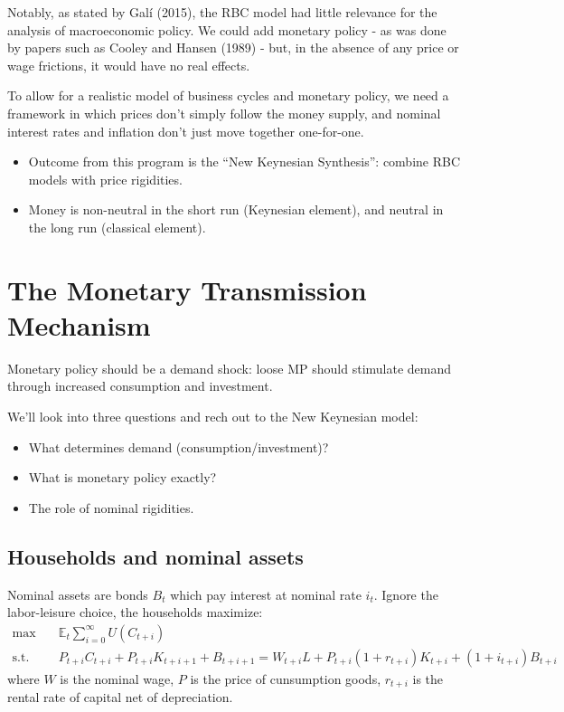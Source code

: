 Notably, as stated by Galí (2015\cite{gali2015monetary}), the RBC model had little relevance for the analysis of macroeconomic policy. We could add
monetary policy - as was done by papers such as Cooley and Hansen (1989\cite{cooley1989inflation}) - 
but, in the absence of any price or wage frictions, it would have no real effects.

To allow for a realistic model of business cycles and monetary policy, we need
a framework in which prices don't simply follow the money supply, and nominal interest rates and
inflation don't just move together one-for-one.

\begin{itemize}
    \item Outcome from this program is the “New Keynesian
    Synthesis”: combine RBC models with price rigidities.
    \item Money is non-neutral in the short run (Keynesian
    element), and neutral in the long run (classical element).
\end{itemize}

\section{The Monetary Transmission Mechanism}

Monetary policy should be a demand shock: loose MP should
stimulate demand through increased consumption and
investment.

We'll look into three questions and rech out to the New Keynesian model:
\begin{itemize}
    \item What determines demand (consumption/investment)?
    \item What is monetary policy exactly?
    \item The role of nominal rigidities.
\end{itemize}

\subsection{Households and nominal assets}

Nominal assets are bonds $B_t$ which pay interest at nominal rate $i_t$.
Ignore the labor-leisure choice, the households maximize:
\begin{align*}
    \max & \quad \mathbb{E}_t \sum_{i=0}^{\infty}U(C_{t+i} )\\
    \text{s.t.} & \quad P_{t+i}C_{t+i} + P_{t+i}K_{t+i+1} + B_{t+i+1} = W_{t+i}L + P_{t+i}(1+r_{t+i})K_{t+i} + (1+i_{t+i})B_{t+i} 
\end{align*}
where $W$ is the nominal wage, $P$ is the price of cunsumption goods,
$r_{t+i}$ is the rental rate of capital net of depreciation.

